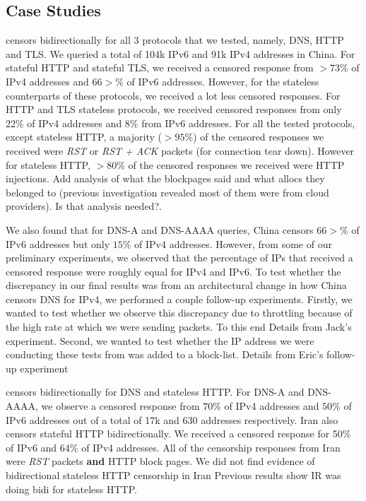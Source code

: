 \subsection{Case Studies}
\label{sec:prevalence:case}

censors bidirectionally for all 3 protocols that we tested, namely, DNS, HTTP and TLS. We queried a total of 104k IPv6 and 91k IPv4 addresses in China. For stateful HTTP and stateful TLS, we received a censored response from  $>73\%$ of IPv4 addresses and $66>\%$ of IPv6 addresses. However, for the stateless counterparts of these protocols, we received a lot less censored responses. For HTTP and TLS stateless protocols, we received censored responses from only 22\% of IPv4 addresses and 8\% from IPv6 addresses. For all the tested protocols, except stateless HTTP, a majority ($>95\%$) of the censored responses we received were \textit{RST} or \textit{RST + ACK} packets (for connection tear down). However for stateless HTTP, $>80\%$ of the censored responses we received were HTTP injections. {\color{red} Add analysis of what the blockpages said and what allocs they belonged to (previous investigation revealed most of them were from cloud providers). Is that analysis needed?}.

We also found that for DNS-A and DNS-AAAA queries, China censors $66>\%$ of IPv6 addresses but only $15\%$ of IPv4 addresses. However, from some of our preliminary experiments, we observed that the percentage of IPs that received a censored response were roughly equal for IPv4 and IPv6. To test whether the discrepancy in our final results was from an architectural change in how China censors DNS for IPv4, we performed a couple follow-up experiments. Firstly, we wanted to test whether we observe this discrepancy due to throttling because of the high rate at which we were sending packets. To this end {\color{red} Details from Jack's experiment}. Second, we wanted to test whether the IP address we were conducting these tests from was added to a block-list. {\color{red} Details from Eric's follow-up experiment}

  
censors bidirectionally for DNS and stateless HTTP. For DNS-A and DNS-AAAA, we observe a censored response from $70\%$ of IPv4 addresses and $50\%$ of IPv6 addresses out of a total of 17k and 630 addresses respectively. Iran also censors stateful HTTP bidirectionally. We received a censored response for 50\% of IPv6 and 64\% of IPv4 addresses. All of the censorship responses from Iran were \textit{RST} packets \textbf{and} HTTP block pages. We did not find evidence of bidirectional stateless HTTP censorship in Iran {\color{red} Previous results show IR was doing bidi for stateless HTTP}.

